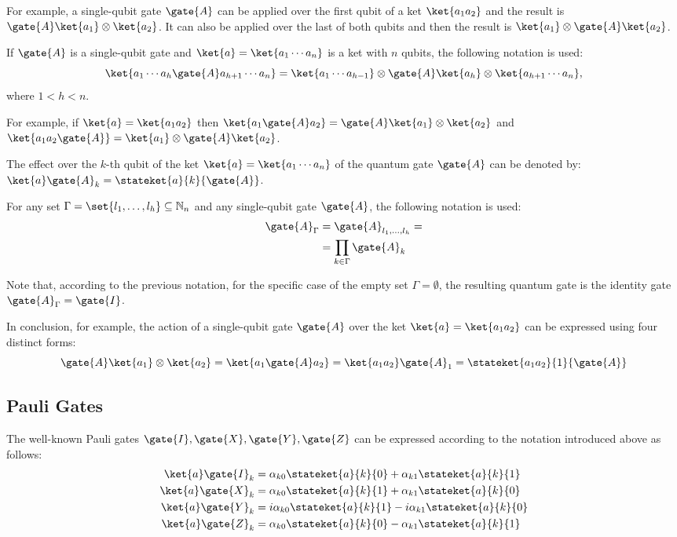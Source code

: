 For example, a single-qubit gate $\gate{A}$   can be applied over the first qubit of a ket $\ket{a_1a_2} $ and the result is $\gate{A}\ket{a_1}\otimes \ket{a_2}$. It can also be applied over the last of both qubits and then the result is $\ket{a_1}\otimes \gate{A}\ket{a_2}$.

\begin{notation}
    If $\gate{A}$ is a single-qubit  gate and $\ket{a}=\ket{a_1\cdots a_n}$ is a ket with $n$ qubits, the following notation is used:
    \[\ket{a_1\cdots a_h\gate{A}a_{h+1}\cdots a_n}=\ket{a_1\cdots a_{h-1}}\otimes\gate{A}\ket{a_h}\otimes \ket{a_{h+1}\cdots a_n},\] where $1<h<n$.
\end{notation}
For example, if $\ket{a}=\ket{a_1a_2}$ then
$\ket{a_1\gate{A}a_2} = \gate{A}\ket{a_1}\otimes \ket{a_2}$ and $\ket{a_1a_2\gate{A}} =\ket{a_1}\otimes \gate{A}\ket{a_2}$.

\begin{notation}
    The effect over the $k$-th qubit of the  ket $\ket{a}=\ket{a_1\cdots a_n}$ of the quantum gate $\gate{A}$ can be denoted by:  $\ket{a}\gate{A}_k=\stateket{a}{k}{\gate{A}}$.
\end{notation}

\begin{notation}
    For any set $\Gamma=\set{l_1,\dots,l_h}\subseteq\mathbb{N}_n$ and any single-qubit gate $\gate{A}$, the following notation is used:
    \begin{align}
        \gate{A}_{\Gamma} &= \gate{A}_{l_1,\dots,l_h}=\\
        &=\prod_{k\in\Gamma}\gate{A}_k
    \end{align}
\end{notation}

Note that, according to the previous notation, for the specific case of the empty set $\Gamma=\emptyset$, the resulting quantum gate is the identity gate $\gate{A}_\Gamma=\gate{I}$.

In conclusion, for example,  the action of a single-qubit gate $\gate{A}$ over the ket $\ket{a}=\ket{a_1a_2}$ can be expressed using four distinct forms:
\begin{equation*}
    \gate{A}\ket{a_1}\otimes \ket{a_2} = \ket{a_1\gate{A}a_2}= \ket{a_1a_2}\gate{A}_1= \stateket{a_1a_2}{1}{\gate{A}}
\end{equation*}

\subsection{Pauli Gates}
The well-known Pauli gates $\gate{I}, \gate{X}, \gate{Y}, \gate{Z}$ can be expressed according to the  notation  introduced above as follows:
\begin{align}
    \ket{a}\gate{I}_k &= \alpha_{k0}\stateket{a}{k}{0}+\alpha_{k1}\stateket{a}{k}{1} \\
    \ket{a}\gate{X}_k &= \alpha_{k0}\stateket{a}{k}{1}+\alpha_{k1}\stateket{a}{k}{0}\\
    \ket{a}\gate{Y}_k &= i \alpha_{k0}\stateket{a}{k}{1}-i \alpha_{k1}\stateket{a}{k}{0}\\
    \ket{a}\gate{Z}_k &= \alpha_{k0}\stateket{a}{k}{0}-\alpha_{k1}\stateket{a}{k}{1}
\end{align}

